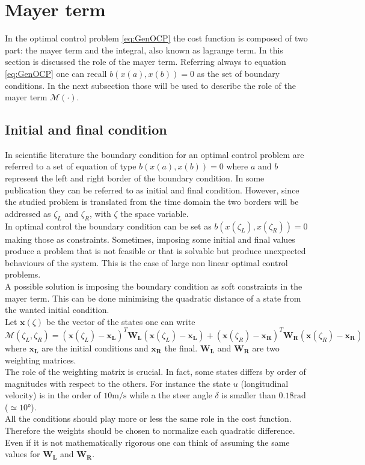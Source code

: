 \section{Mayer term}
%
In the optimal control problem \ref{eq:GenOCP} the cost function is composed of two part: the mayer term and the integral, also known as lagrange term. In this section is discussed the role of the mayer term. Referring always to equation \ref{eq:GenOCP} one can recall $b(x(a),x(b))=0$ as the set of boundary conditions. In the next subsection those will be used to describe the role of the mayer term $\mathcal{M}(\cdot)$.
%
\subsection{Initial and final condition}
%
In scientific literature the boundary condition for an optimal control problem are referred to a set of equation of type $b(x(a),x(b))=0$ where $a$ and $b$ represent the left and right border of the boundary condition. In some publication they can be referred to as initial and final condition. However, since the studied problem is translated from the time domain the two borders will be addressed as $\zeta_L$ and $\zeta_R$, with $\zeta$ the space variable.\\
In optimal control the boundary condition can be set as $b(x(\zeta_L),x(\zeta_R))=0$ making those as constraints. Sometimes, imposing some initial and final values produce a problem that is not feasible or that is solvable but produce unexpected behaviours of the system. This is the case of large non linear optimal control problems.\\
A possible solution is imposing the boundary condition as soft constraints in the mayer term. This can be done minimising the quadratic distance  of a state from the wanted initial condition.\\
Let $\mathbf{x}(\zeta)$ be the vector of the states one can write
%
\begin{equation}
    \mathcal{M}(\zeta_L,\zeta_R) = (\mathbf{x}(\zeta_L)-\mathbf{x_L})^T \mathbf{W_{L}} (\mathbf{x}(\zeta_L)-\mathbf{x_L}) + (\mathbf{x}(\zeta_R)-\mathbf{x_R})^T \mathbf{W_{R}} (\mathbf{x}(\zeta_R)-\mathbf{x_R})
\end{equation}
%
where $\mathbf{x_L}$ are the initial conditions and $\mathbf{x_R}$ the final. $\mathbf{W_{L}}$ and $\mathbf{W_{R}}$ are two weighting matrices.\\
The role of the weighting matrix is crucial. In fact, some states differs by order of magnitudes with respect to the others. For instance the state $u$ (longitudinal velocity) is in the order of $10\si{\metre/\second}$ while a the steer angle $\delta$ is smaller than $0.18 \si{\radian}$ ($\simeq 10\si{\degree}$).\\
All the conditions should play more or less the same role in the cost function. Therefore the weights should be chosen to normalize each quadratic difference.\\
Even if it is not mathematically rigorous one can think of assuming the same values for $\mathbf{W_{L}}$ and $\mathbf{W_{R}}$.
%
